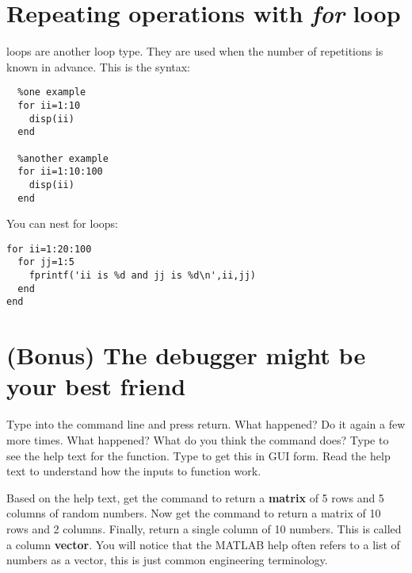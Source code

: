 \documentclass{article}
\begin{document}
\section{Repeating operations with \emph{for} loop}

 loops are another loop type. They are used when the number of repetitions is known in advance. This is the syntax:
\begin{lstlisting}
  %one example
  for ii=1:10
    disp(ii)
  end

  %another example
  for ii=1:10:100
    disp(ii)
  end
\end{lstlisting}

You can nest for loops:
\begin{lstlisting}
for ii=1:20:100
  for jj=1:5
    fprintf('ii is %d and jj is %d\n',ii,jj)
  end
end
\end{lstlisting}



\section{(Bonus) The debugger might be your best friend}


\pagebreak


Type  into the command line and press return. What happened?
Do it again a few more times. What happened?
What do you think the  command does?
Type  to see the help text for the  function.
Type  to get this in GUI form.
Read the help text to understand how the inputs to function work.

Based on the help text, get the  command to return a \textbf{matrix} of 5 rows and 5 columns of random numbers. Now get the  command to return a matrix of 10 rows and 2 columns. Finally, return a single column of 10 numbers. This is called a column \textbf{vector}. You will notice that the MATLAB help often refers to a list of numbers as a vector, this is just common engineering terminology.
\end{document}
